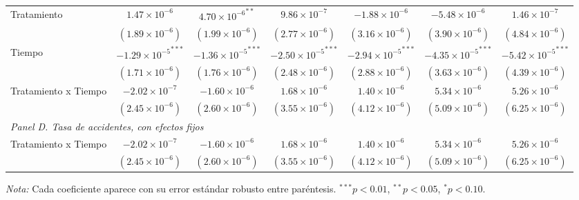 \begin{table}[htbp]
\begin{adjustbox}{max width=\textwidth}
\begin{tabular}{lcccccc}
        Tratamiento & $1.47 \times 10^{-6}$ & ${4.70 \times 10^{-6}}^{**}$ & $9.86 \times 10^{-7}$ & $-1.88 \times 10^{-6}$ & $-5.48 \times 10^{-6}$ & $1.46 \times 10^{-7}$ \\
         & $(1.89 \times 10^{-6})$ & $(1.99 \times 10^{-6})$ & $(2.77 \times 10^{-6})$ & $(3.16 \times 10^{-6})$ & $(3.90 \times 10^{-6})$ & $(4.84 \times 10^{-6})$ \\
        Tiempo & ${-1.29 \times 10^{-5}}^{***}$ & ${-1.36 \times 10^{-5}}^{***}$ & ${-2.50 \times 10^{-5}}^{***}$ & ${-2.94 \times 10^{-5}}^{***}$ & ${-4.35 \times 10^{-5}}^{***}$ & ${-5.42 \times 10^{-5}}^{***}$ \\
         & $(1.71 \times 10^{-6})$ & $(1.76 \times 10^{-6})$ & $(2.48 \times 10^{-6})$ & $(2.88 \times 10^{-6})$ & $(3.63 \times 10^{-6})$ & $(4.39 \times 10^{-6})$ \\
        Tratamiento x Tiempo & $-2.02 \times 10^{-7}$ & $-1.60 \times 10^{-6}$ & $1.68 \times 10^{-6}$ & $1.40 \times 10^{-6}$ & $5.34 \times 10^{-6}$ & $5.26 \times 10^{-6}$ \\
         & $(2.45 \times 10^{-6})$ & $(2.60 \times 10^{-6})$ & $(3.55 \times 10^{-6})$ & $(4.12 \times 10^{-6})$ & $(5.09 \times 10^{-6})$ & $(6.25 \times 10^{-6})$ \\
        \midrule
        \multicolumn{7}{l}{\textit{Panel D. Tasa de accidentes, con efectos fijos}} \\
        Tratamiento x Tiempo & $-2.02 \times 10^{-7}$ & $-1.60 \times 10^{-6}$ & $1.68 \times 10^{-6}$ & $1.40 \times 10^{-6}$ & $5.34 \times 10^{-6}$ & $5.26 \times 10^{-6}$ \\
         & $(2.45 \times 10^{-6})$ & $(2.60 \times 10^{-6})$ & $(3.55 \times 10^{-6})$ & $(4.12 \times 10^{-6})$ & $(5.09 \times 10^{-6})$ & $(6.25 \times 10^{-6})$ \\
        \bottomrule
    \end{tabular}
    \end{adjustbox}

    \vspace{0.4em}
    \begin{minipage}{0.93\textwidth}
        \tiny \textit{Nota:} Cada coeficiente aparece con su error estándar robusto entre paréntesis. ${}^{***} p<0.01$, ${}^{**} p<0.05$, ${}^{*} p<0.10$.
    \end{minipage}
\end{table}

